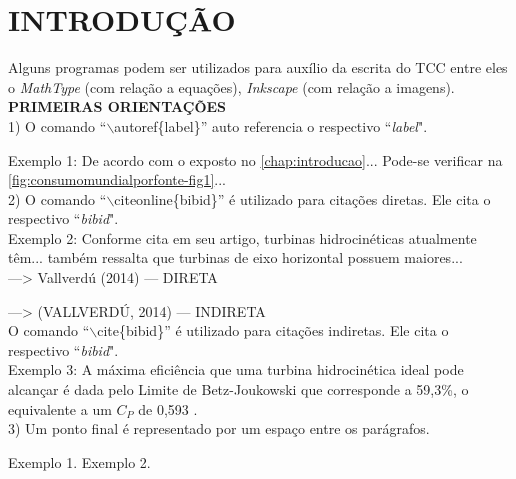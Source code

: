 
\chapter{INTRODUÇÃO}
\label{chap:introducao}

Alguns programas podem ser utilizados para auxílio da escrita do TCC entre eles o \textit{MathType} (com relação a equações), \textit{Inkscape} (com relação a imagens). \\ %

\textbf{PRIMEIRAS ORIENTAÇÕES}\\ %

1) O comando ``$\backslash$autoref\{label\}'' auto referencia o respectivo ``\textit{label}".

Exemplo 1: De acordo com o exposto no \autoref{chap:introducao}... Pode-se verificar na \autoref{fig:consumomundialporfonte-fig1}...\\

2) O comando ``$\backslash$citeonline\{bibid\}'' é utilizado para citações diretas. Ele cita o respectivo ``\textit{bibid}".\\

Exemplo 2:  Conforme  cita em seu artigo, turbinas hidrocinéticas atualmente têm...  também ressalta que turbinas de eixo horizontal possuem maiores...\\

  --->  Vallverdú (2014) --- DIRETA

\cite{vallverdu2014}   --->  (VALLVERDÚ, 2014) --- INDIRETA\\

O comando ``$\backslash$cite\{bibid\}'' é utilizado para citações indiretas. Ele cita o respectivo ``\textit{bibid}".\\

Exemplo 3: A máxima eficiência que uma turbina hidrocinética ideal pode alcançar é dada pelo Limite de Betz-Joukowski que corresponde a 59,3\%, o equivalente a um $C_P$ de 0,593 \cite{vallverdu2014, SHINOMIYA2015d}.\\ %

3) Um ponto final é representado por um espaço entre os parágrafos.

Exemplo 1.
Exemplo 2.

